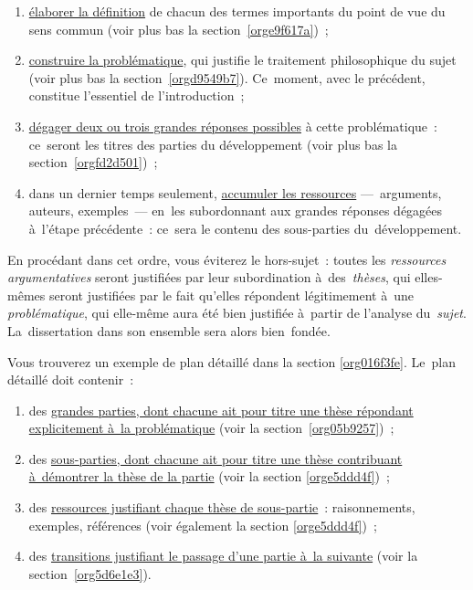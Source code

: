 \documentclass[a4paper,12pt]{report}
\begin{document}
\begin{enumerate}
\item \uline{élaborer la définition} de chacun des termes importants du point de
vue du sens commun (voir plus bas la section \ref{orge9f617a}) ;

\item \uline{construire la problématique}, qui justifie le traitement
philosophique du sujet (voir plus bas la section \ref{orgd9549b7}).
Ce moment, avec le précédent, constitue l'essentiel de
l'introduction ;

\item \uline{dégager deux ou trois grandes réponses possibles} à cette
problématique : ce seront les titres des parties du développement
(voir plus bas la section \ref{orgfd2d501}) ;

\item dans un dernier temps seulement, \uline{accumuler les ressources}
--- arguments, auteurs, exemples --- en les subordonnant aux grandes
réponses dégagées à l'étape précédente : ce sera le contenu des
sous-parties du développement.
\end{enumerate}

En procédant dans cet ordre, vous éviterez le hors-sujet : toutes les
\emph{ressources argumentatives} seront justifiées par leur subordination
à des \emph{thèses}, qui elles-mêmes seront justifiées par le fait qu'elles
répondent légitimement à une \emph{problématique}, qui elle-même aura été
bien justifiée à partir de l'analyse du \emph{sujet}. La dissertation dans
son ensemble sera alors bien fondée.

Vous trouverez un exemple de plan détaillé dans la section \ref{org016f3fe}.
Le plan détaillé doit contenir : 

\begin{enumerate}
\item des \uline{grandes parties, dont chacune ait pour titre une thèse répondant
explicitement à la problématique} (voir la section \ref{org05b9257}) ;

\item des \uline{sous-parties, dont chacune ait pour titre une thèse contribuant
à démontrer la thèse de la partie} (voir la section \ref{orge5ddd4f}) ;

\item des \uline{ressources justifiant chaque thèse de sous-partie} :
raisonnements, exemples, références (voir également la section
\ref{orge5ddd4f}) ;

\item des \uline{transitions justifiant le passage d'une partie à la suivante}
(voir la section \ref{org5d6e1e3}).
\end{enumerate}
\end{document}
